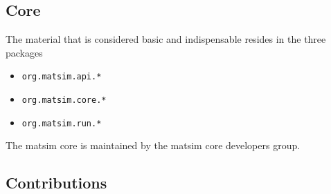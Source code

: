 \subsection{Core}
\label{sec:extending-core}
The material that is considered basic and indispensable resides in the three packages 
\begin{itemize}\styleItemize
\item \lstinline{org.matsim.api.*}
\item \lstinline{org.matsim.core.*}
\item \lstinline{org.matsim.run.*}
\end{itemize}
%
The \gls{matsim} core is maintained by the \gls{matsim} core developers group.

 


\subsection{Contributions}

